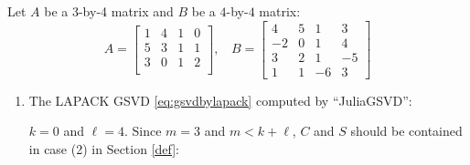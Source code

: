 \newpage
\begin{example} \label{eg:case2a} 
{\rm 
Let $A$ be a 3-by-4 matrix and $B$ be a $4$-by-$4$ matrix:
        \begin{equation*}
            A = \begin{bmatrix}
                1 & 4 & 1 & 0\\
                5 & 3 & 1 & 1\\
                3 & 0 & 1 & 2\\
            \end{bmatrix}, \ \ \ \
            B = \begin{bmatrix}
                4 & 5 & 1 & 3 \\
                -2 & 0 & 1 & 4 \\
                3 & 2 & 1 & -5 \\
                1 & 1 & -6 & 3
            \end{bmatrix}
\end{equation*}

\begin{enumerate}[(1).]
        \item The LAPACK GSVD \eqref{eq:gsvdbylapack} computed by ``JuliaGSVD'': 
        
            $k = 0$ and $\ell = 4$. Since $m = 3$ and $m < k+\ell$, $C$ and $S$ should be contained in case (2) in Section \ref{def}:
            

\end{enumerate}}
\end{example}
